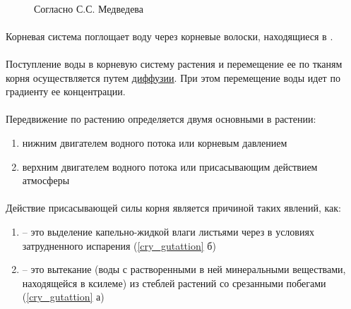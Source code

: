 \begin{figure}[h]
\paragraph*{}Согласно С.С. Медведева \cite{medvedev_2012}
\label{root_shema}
\end{figure}


\paragraph*{}Корневая система поглощает воду через корневые волоски, находящиеся в .


\paragraph*{}Поступление воды в корневую систему растения и перемещение ее по тканям корня осуществляется путем \hyperlink{diffusion}{диффузии}. При этом перемещение воды идет по градиенту ее концентрации.

\paragraph*{}Передвижение по растению определяется двумя основными  в растении:

\begin{enumerate}

\item нижним двигателем водного потока или корневым давлением
\item верхним двигателем водного потока или присасывающим действием атмосферы

\end{enumerate}

\paragraph*{}Действие присасывающей силы корня является причиной таких явлений, как:

\begin{enumerate}

	\item {} -- это выделение капельно-жидкой влаги листьями через  в условиях затрудненного испарения (\ris \ref{cry_gutattion} б)
	\item {} -- это вытекание  (воды с растворенными в ней минеральными веществами, находящейся в ксилеме) из стеблей растений со срезанными побегами (\ris \ref{cry_gutattion} а)

\end{enumerate}

